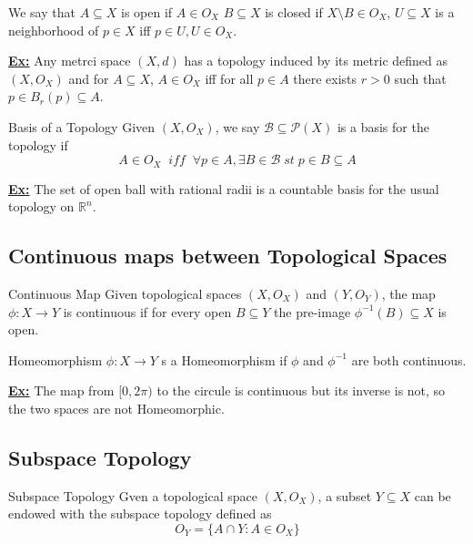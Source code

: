 \documentclass{article}
\begin{document}
\vskip 0.5cm
We say that $A \subseteq X$ is open if $A \in O_X$ $B \subseteq X$ is closed if $X \setminus B \in O_X$, $U \subseteq X$ is a neighborhood of $p \in X$ iff $p \in U, U \in O_X$.

\vskip 0.5cm
\underline{\textbf{Ex:}} Any metrci space $(X, d)$ has a topology induced by its metric defined as $(X, O_X)$ and for $A \subseteq X$, $A \in O_X$ iff for all $p \in A$ there exists $r > 0$ such that $p \in B_r(p) \subseteq A$.

\vskip 0.5cm
\begin{mathdefinitionbox}{Basis of a Topology}
\vskip 0.25cm
  Given $(X, O_X)$, we say $\mathcal B \subseteq \mathcal P(X)$ is a basis for the topology if 
  \[ A \in O_X \;\;iff\;\; \forall p \in A, \exists B \in \mathcal B \;st\; p \in B \subseteq A\]
\end{mathdefinitionbox}

\vskip 0.25cm
\underline{\textbf{Ex:}} The set of open ball with rational radii is a countable basis for the usual topology on $\mathbb{R}^n$.

\vskip 0.5cm
\subsection{Continuous maps between Topological Spaces}

\begin{mathdefinitionbox}{Continuous Map}
  Given topological spaces $(X, O_X)$ and $(Y, O_Y)$, the map $\phi : X \rightarrow Y$ is continuous if for every open $B \subseteq Y$ the pre-image $\phi^{-1}(B) \subseteq X$ is open.
\end{mathdefinitionbox}

\begin{mathdefinitionbox}{Homeomorphism}
  $\phi : X \rightarrow Y$ s a Homeomorphism if $\phi$ and $\phi^{-1}$ are both continuous.
\end{mathdefinitionbox}

\underline{\textbf{Ex:}} The map from $[0, 2\pi)$ to the circule is continuous but its inverse is not, so the two spaces are not Homeomorphic.

\vskip 0.5cm
\subsection{Subspace Topology}

\begin{mathdefinitionbox}{Subspace Topology}
  Gven a topological space $(X, O_X)$, a subset $Y \subseteq X$ can be endowed with the subspace topology defined as 
  \[ O_Y = \{ A \cap Y  : A \in O_X \} \]
\end{mathdefinitionbox}
\end{document}
